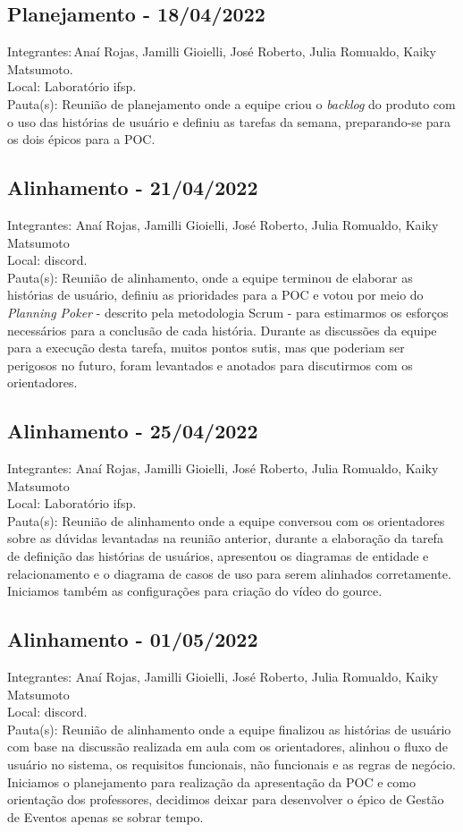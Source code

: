 \subsection{Planejamento - 18/04/2022}
\noindent Integrantes:\,Anaí Rojas, Jamilli Gioielli, José Roberto, Julia Romualdo, Kaiky Matsumoto. \\
Local: Laboratório \acs{ifsp}.\\
Pauta(s): Reunião de planejamento onde a equipe criou o \textsl{backlog} do produto com o uso das histórias de usuário e definiu as tarefas da semana, preparando-se para os dois épicos para a \acs{POC}.

\subsection{Alinhamento - 21/04/2022}
\noindent Integrantes: Anaí Rojas, Jamilli Gioielli, José Roberto, Julia Romualdo, Kaiky Matsumoto \\
Local: \gls{discord}.\\
Pauta(s): Reunião de alinhamento, onde a equipe terminou de elaborar as histórias de usuário, definiu as prioridades para a \acs{POC} e votou por meio do \textsl{Planning Poker} - descrito pela metodologia Scrum - para estimarmos os esforços necessários para a conclusão de cada história. Durante as discussões da equipe para a execução desta tarefa, muitos pontos sutis, mas que poderiam ser perigosos no futuro, foram levantados e anotados para discutirmos com os orientadores. 

\subsection{Alinhamento - 25/04/2022}
\noindent Integrantes: Anaí Rojas, Jamilli Gioielli, José Roberto, Julia Romualdo, Kaiky Matsumoto \\
Local: Laboratório \acs{ifsp}.\\
Pauta(s): Reunião de alinhamento onde a equipe conversou com os orientadores sobre as dúvidas levantadas na reunião anterior, durante a elaboração da tarefa de definição das histórias de usuários, apresentou os diagramas de entidade e relacionamento e o diagrama de casos de uso para serem alinhados corretamente. Iniciamos também as configurações para criação do vídeo do \gls{gource}.

\subsection{Alinhamento - 01/05/2022}
\noindent Integrantes: Anaí Rojas, Jamilli Gioielli, José Roberto, Julia Romualdo, Kaiky Matsumoto \\
Local: \gls{discord}.\\
Pauta(s): Reunião de alinhamento onde a equipe finalizou as histórias de usuário com base na discussão realizada em aula com os orientadores, alinhou o fluxo de usuário no sistema, os requisitos funcionais, não funcionais e as regras de negócio. Iniciamos o planejamento para realização da apresentação da \acs{POC} e como orientação dos professores, decidimos deixar para desenvolver o épico de Gestão de Eventos apenas se sobrar tempo. 


